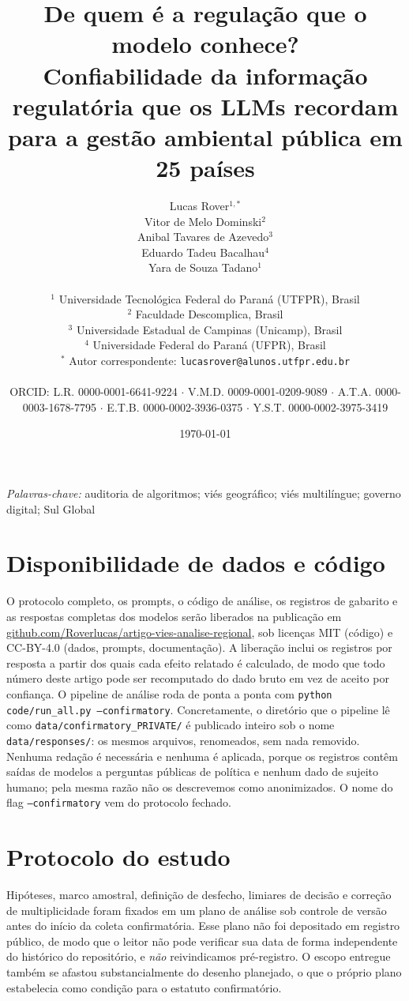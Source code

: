 \documentclass[11pt,a4paper]{article}
\title{De quem é a regulação que o modelo conhece?\\
Confiabilidade da informação regulatória que os LLMs recordam para a gestão
ambiental pública em 25 países}
\author{
  Lucas Rover$^{1,*}$ \\
  Vitor de Melo Dominski$^{2}$ \\
  Anibal Tavares de Azevedo$^{3}$ \\
  Eduardo Tadeu Bacalhau$^{4}$ \\
  Yara de Souza Tadano$^{1}$ \\
  \\
  \small $^1$ Universidade Tecnológica Federal do Paraná (UTFPR), Brasil\\
  \small $^2$ Faculdade Descomplica, Brasil\\
  \small $^3$ Universidade Estadual de Campinas (Unicamp), Brasil\\
  \small $^4$ Universidade Federal do Paraná (UFPR), Brasil\\
  \small $^*$ Autor correspondente: \texttt{lucasrover@alunos.utfpr.edu.br}\\
  \\
  \small ORCID: L.R. 0000-0001-6641-9224 $\cdot$ V.M.D. 0009-0001-0209-9089
  $\cdot$ A.T.A. 0000-0003-1678-7795 $\cdot$ E.T.B. 0000-0002-3936-0375
  $\cdot$ Y.S.T. 0000-0002-3975-3419
}
\date{\today}
\begin{document}
\maketitle



\noindent\emph{Palavras-chave:} auditoria de algoritmos; viés geográfico; viés
multilíngue; governo digital; Sul Global

\vspace{1em}









\section*{Disponibilidade de dados e código}

O protocolo completo, os prompts, o código de análise, os registros de gabarito e
as respostas completas dos modelos serão liberados na publicação em
\href{https://github.com/Roverlucas/artigo-vies-analise-regional}{github.com/Roverlucas/artigo-vies-analise-regional},
sob licenças MIT (código) e CC-BY-4.0 (dados, prompts, documentação). A liberação
inclui os registros por resposta a partir dos quais cada efeito relatado é
calculado, de modo que todo número deste artigo pode ser recomputado do dado
bruto em vez de aceito por confiança. O pipeline de análise roda de ponta a ponta
com \texttt{python code/run\_all.py --confirmatory}. Concretamente, o diretório
que o pipeline lê como \texttt{data/confirmatory\_PRIVATE/} é publicado inteiro
sob o nome \texttt{data/responses/}: os mesmos arquivos, renomeados, sem nada
removido. Nenhuma redação é necessária e nenhuma é aplicada, porque os registros
contêm saídas de modelos a perguntas públicas de política e nenhum dado de
sujeito humano; pela mesma razão não os descrevemos como anonimizados. O nome do
flag \texttt{--confirmatory} vem do protocolo fechado.

\section*{Protocolo do estudo}

Hipóteses, marco amostral, definição de desfecho, limiares de decisão e correção
de multiplicidade foram fixados em um plano de análise sob controle de versão
antes do início da coleta confirmatória. Esse plano não foi depositado em
registro público, de modo que o leitor não pode verificar sua data de forma
independente do histórico do repositório, e \emph{não} reivindicamos
pré-registro. O escopo entregue também se afastou substancialmente do desenho
planejado, o que o próprio plano estabelecia como condição para o estatuto
confirmatório.
\end{document}
